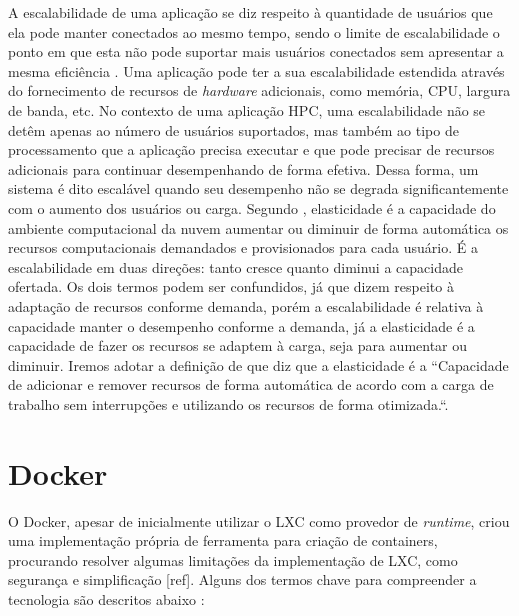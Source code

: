 \documentclass[twoside,english,brazilian]{UNISINOSartigo}
\begin{document}
A escalabilidade de uma aplicação se diz respeito à quantidade de usuários que ela pode manter conectados ao mesmo tempo, sendo o limite de escalabilidade o ponto em que esta não pode suportar mais usuários conectados sem apresentar a mesma  eficiência \cite{Wilder12}. Uma aplicação pode ter a sua escalabilidade estendida através do fornecimento de recursos de \textit{hardware} adicionais, como memória, CPU, largura de banda, etc. No contexto de uma aplicação HPC, uma escalabilidade não se detêm apenas ao número de usuários suportados, mas também ao tipo de processamento que a aplicação precisa executar e que pode precisar de recursos adicionais para continuar desempenhando de forma efetiva. Dessa forma, um sistema é dito escalável quando seu desempenho não se degrada significantemente com o aumento dos usuários ou carga.
Segundo , elasticidade é a capacidade do ambiente computacional da nuvem aumentar ou diminuir de forma automática os recursos computacionais demandados e provisionados para cada usuário. É a escalabilidade em duas direções: tanto cresce quanto diminui a capacidade ofertada. Os dois termos podem ser confundidos, já que dizem respeito à adaptação de recursos conforme demanda, porém a escalabilidade é relativa à capacidade manter o desempenho conforme a demanda, já a elasticidade é a capacidade de fazer os recursos se adaptem à carga, seja para aumentar ou diminuir. 
Iremos adotar a definição de  que diz que a elasticidade é a ``Capacidade de adicionar e remover recursos de forma automática de acordo com a carga de trabalho sem interrupções e utilizando os recursos de forma otimizada.``.

\section{Docker}
\label{docker}

O Docker, apesar de inicialmente utilizar o LXC como provedor de \textit{runtime}, criou uma implementação própria de ferramenta para criação de containers, procurando resolver algumas limitações da implementação de LXC, como segurança e simplificação [ref].
Alguns dos termos chave para compreender a tecnologia são descritos abaixo \cite{whitepaperDocker2016}:  
\end{document}
